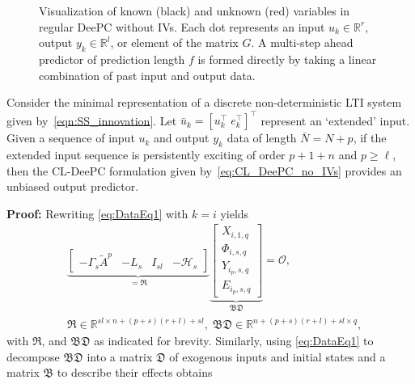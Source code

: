 \begin{figure}[b!]
\centering

\caption{Visualization of known (black) and unknown (red) variables in regular \ac{DeePC} without \ac{IVs}. Each dot represents an input $u_k\in\mathbb{R}^r$, output $y_k\in\mathbb{R}^l$, or element of the matrix $G$. A multi-step ahead predictor of prediction length $f$ is formed directly by taking a linear combination of past input and output data.\\\vspace{0.75mm}}
\label{fig:regular-DeePC}
\end{figure}
%
\setcounter{thm}{0}
\begin{thm}\label{theorem:main_result}
    Consider the minimal representation of a discrete non-deterministic \ac{LTI} system given by~\eqref{eqn:SS_innovation}. Let $\bar{u}_k=\left[u_k^\top \; e_k^\top\right]^\top$ represent an `extended' input. Given a sequence of input $u_k$ and output $y_k$ data of length $\bar{N}=N+p$, if the extended input sequence is persistently exciting of order $p+1+n$ and $p\geq\ell$, then the \ac{CL-DeePC} formulation given by~\eqref{eq:CL_DeePC_no_IVs} provides an unbiased output predictor.%
\end{thm}
\textbf{Proof:} 
Rewriting \eqref{eq:DataEq1} with $k=i$ yields
\begin{align*}
    &\underbrace{\begin{bmatrix}-\Gamma_s \tilde{A}^p & -L_s & I_{sl}&-\mathcal{H}_s\end{bmatrix}}_{= \mathfrak{R}}
    \underbrace{\begin{bmatrix}
        X_{i,1,q}\\
        \Phi_{i,s,q}\\
        Y_{i_p,s,q}\\
        E_{i_p,s,q}
    \end{bmatrix}}_{\mathfrak{B}\mathfrak{D}}=\mathcal{O},\\
    &\mathfrak{R}\in\mathbb{R}^{sl\times n+(p+s)(r+l)+sl},\;\mathfrak{BD}\in\mathbb{R}^{n+(p+s)(r+l)+sl \times q},
\end{align*}
with $\mathfrak{R}$, and $\mathfrak{BD}$ as indicated for brevity. Similarly, using \eqref{eq:DataEq1} to decompose $\mathfrak{BD}$ into a matrix $\mathfrak{D}$ of exogenous inputs and initial states and a matrix $\mathfrak{B}$ to describe their effects obtains
